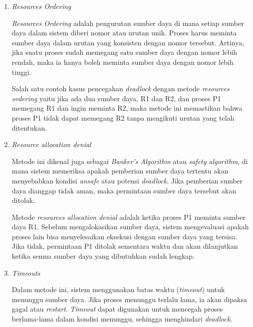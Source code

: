 \documentclass[12pt]{article}
\begin{document}
\begin{enumerate}
    \item \textit{Resources Ordering}

          \par \textit{Resources Ordering} adalah pengurutan sumber daya di mana setiap sumber daya
          dalam sistem diberi nomor atau urutan unik. Proses harus meminta sumber daya
          dalam urutan yang konsisten dengan nomor tersebut. Artinya, jika suatu proses
          sudah memegang satu sumber daya dengan nomor lebih rendah, maka ia hanya boleh
          meminta sumber daya dengan nomor lebih tinggi.

          \par Salah satu contoh kasus pencegahan \textit{deadlock} dengan metode
          \textit{resources ordering} yaitu jika ada dua sumber daya, R1 dan R2, dan
          proses P1 memegang R1 dan ingin meminta R2, maka metode ini memastikan bahwa
          proses P1 tidak dapat memegang R2 tanpa mengikuti urutan yang telah ditentukan.

    \item \textit{Resource allocation denial}

          \par Metode ini dikenal juga sebagai \textit{Banker's Algorithm} atau \textit{safety
              algorithm}, di mana sistem memeriksa apakah pemberian sumber daya tertentu akan
          menyebabkan kondisi \textit{unsafe} atau potensi \textit{deadlock}. Jika
          pemberian sumber daya dianggap tidak aman, maka permintaan sumber daya tersebut
          akan ditolak.

          \par Metode \textit{resources allocation denial} adalah ketika proses P1 meminta
          sumber daya R1. Sebelum mengalokasikan sumber daya, sistem mengevaluasi apakah
          proses lain bisa menyelesaikan eksekusi dengan sumber daya yang tersisa. Jika
          tidak, permintaan P1 ditolak sementara waktu dan akan dilanjutkan ketika semua
          sumber daya yang dibutuhkan sudah lengkap.

    \item \textit{Timeouts}

          \par Dalam metode ini, sistem menggunakan batas waktu (\textit{timeout}) untuk
          menunggu sumber daya. Jika proses menunggu terlalu lama, ia akan dipaksa gagal
          atau \textit{restart}. \textit{Timeout} dapat digunakan untuk mencegah proses
          berlama-lama dalam kondisi menunggu, sehingga menghindari \textit{deadlock}.


\end{enumerate}
\end{document}
